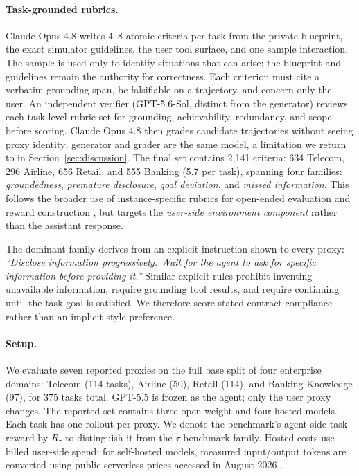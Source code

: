 \documentclass{article}
\begin{document}
\paragraph{Task-grounded rubrics.}
Claude Opus 4.8 writes 4--8 atomic criteria per task from the private blueprint, the exact simulator guidelines, the user tool surface, and one sample interaction. The sample is used only to identify situations that can arise; the blueprint and guidelines remain the authority for correctness. Each criterion must cite a verbatim grounding span, be falsifiable on a trajectory, and concern only the user. An independent verifier (GPT-5.6-Sol, distinct from the generator) reviews each task-level rubric set for grounding, achievability, redundancy, and scope before scoring. Claude Opus 4.8 then grades candidate trajectories without seeing proxy identity; generator and grader are the same model, a limitation we return to in Section~\ref{sec:discussion}. The final set contains 2,141 criteria: 634 Telecom, 296 Airline, 656 Retail, and 555 Banking (5.7 per task), spanning four families: \emph{groundedness}, \emph{premature disclosure}, \emph{goal deviation}, and \emph{missed information}. This follows the broader use of instance-specific rubrics for open-ended evaluation and reward construction \citep{arora2025healthbench,gunjal2026rar}, but targets the \emph{user-side environment component} rather than the assistant response.

The dominant family derives from an explicit instruction shown to every proxy: \emph{``Disclose information progressively. Wait for the agent to ask for specific information before providing it.''} Similar explicit rules prohibit inventing unavailable information, require grounding tool results, and require continuing until the task goal is satisfied. We therefore score stated contract compliance rather than an implicit style preference.

\paragraph{Setup.}
We evaluate seven reported proxies on the full base split of four enterprise domains: Telecom (114 tasks), Airline (50), Retail (114), and Banking Knowledge (97), for 375 tasks total. GPT-5.5 is frozen as the agent; only the user proxy changes. The reported set contains three open-weight and four hosted models. Each task has one rollout per proxy. We denote the benchmark's agent-side task reward by $R_{\tau}$ to distinguish it from the $\tau$ benchmark family. Hosted costs use billed user-side spend; for self-hosted models, measured input/output tokens are converted using public serverless prices accessed in August 2026 \citep{together2026pricing}.
\end{document}
